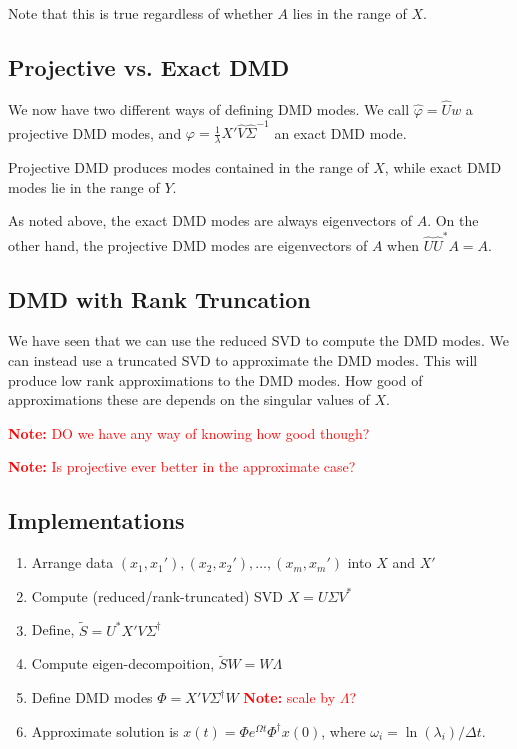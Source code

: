 \documentclass[12pt]{article}
\newcommand{\note}[1]{\textcolor{red}{\textbf{Note:} #1}}
\begin{document}
Note that this is true regardless of whether \( A \) lies in the range of \( X \).


\subsection{Projective vs. Exact DMD}
We now have two different ways of defining DMD modes.
We call \( \hat{\varphi} = \hat{U} w \) a projective DMD modes, and \( \varphi = \frac{1}{\lambda} X'\hat{V}\hat{\Sigma}^{-1} \) an exact DMD mode.

Projective DMD produces modes contained in the range of \( X \), while exact DMD modes lie in the range of \( Y \).

As noted above, the exact DMD modes are always eigenvectors of \( A \). On the other hand, the projective DMD modes are eigenvectors of \( A \) when \( \hat{U}\hat{U}^*A = A \).


\subsection{DMD with Rank Truncation}

We have seen that we can use the reduced SVD to compute the DMD modes. We can instead use a truncated SVD to approximate the DMD modes. This will produce low rank approximations to the DMD modes. How good of approximations these are depends on the singular values of \( X \).

\note{DO we have any way of knowing how good though?}

\note{Is projective ever better in the approximate case?}


\subsection{Implementations}

\begin{method}
\begin{enumerate}
    \item Arrange data \( (x_1,x_1'), (x_2, x_2'), \ldots, (x_m,x_m')\) into \( X \) and \( X' \)
    \item Compute (reduced/rank-truncated) SVD \( X = U\Sigma V^* \)
    \item Define, \( \tilde{S} = U^*X'V\Sigma^{\dagger} \)
    \item Compute eigen-decompoition, \( \tilde{S} W = W\Lambda \)
    \item Define DMD modes \( \Phi = X'V\Sigma^\dagger W \)
        \note{scale by \( \Lambda \)?}
    \item Approximate solution is \( x(t) = \Phi e^{\Omega t} \Phi^\dagger x(0) \), where \( \omega_i = \ln(\lambda_i)/\Delta t \).
\end{enumerate}
\end{method}
\end{document}
